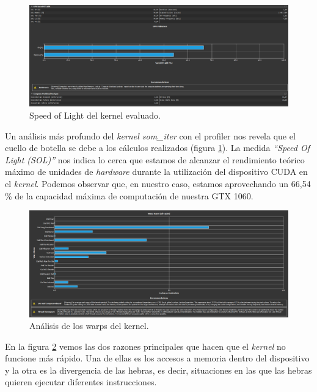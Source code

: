 \begin{figure}[ht]
\centering
\includegraphics[scale=0.3]{imagenes/som_sol.png}
\caption{Speed of Light del kernel evaluado.}
\label{img:sol}
\end{figure}

Un análisis más profundo del \textit{kernel som\_iter} con el profiler nos revela que el cuello de botella se debe a los cálculos realizados (figura \ref{img:sol}). La medida \textit{``Speed Of Light (SOL)''} nos indica lo cerca que estamos de alcanzar el rendimiento teórico máximo de unidades de \textit{hardware} durante la utilización del dispositivo CUDA en el \textit{kernel}. Podemos observar que, en nuestro caso, estamos aprovechando un 66,54 \% de la capacidad máxima de computación de nuestra GTX 1060.\\

\begin{figure}[ht]
\centering
\includegraphics[scale=0.3]{imagenes/som_warp_states.png}
\caption{Análisis de los warps del kernel.}
\label{img:warpssom}
\end{figure}

En la figura \ref{img:warpssom} vemos las dos razones principales que hacen que el \textit{kernel} no funcione más rápido. Una de ellas es los accesos a memoria dentro del dispositivo y la otra es la divergencia de las hebras, es decir, situaciones en las que las hebras quieren ejecutar diferentes instrucciones.\\

